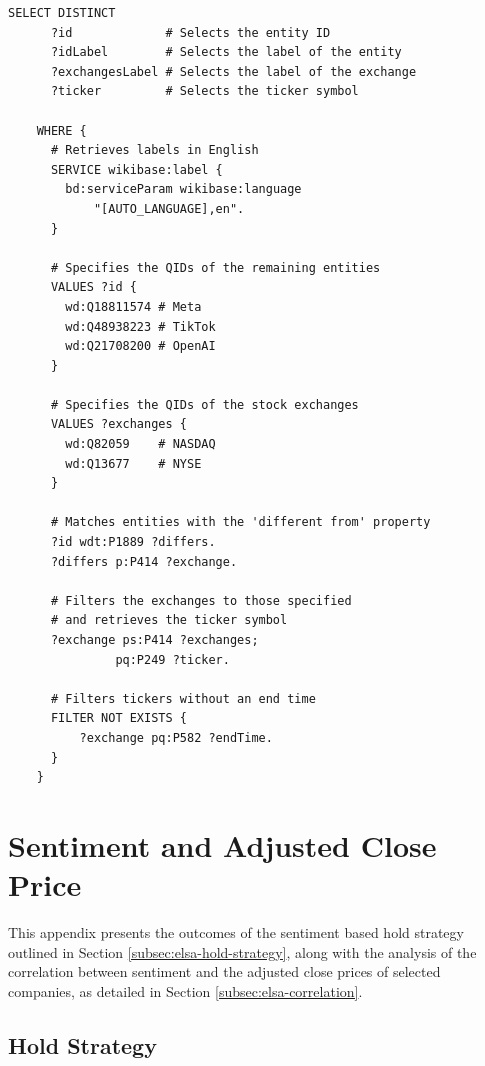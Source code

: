 \begin{lstlisting}[language=SPARQL, caption={SPARQL Query 3: Retrieve entity information for remaining entities with the \textit{different from} property.}, label={lst:sparql_query_3}]
	SELECT DISTINCT 
	  ?id             # Selects the entity ID
	  ?idLabel        # Selects the label of the entity
	  ?exchangesLabel # Selects the label of the exchange
	  ?ticker         # Selects the ticker symbol
	  
	WHERE {
	  # Retrieves labels in English
	  SERVICE wikibase:label {
		bd:serviceParam wikibase:language 
			"[AUTO_LANGUAGE],en".
	  }
	
	  # Specifies the QIDs of the remaining entities
	  VALUES ?id { 
		wd:Q18811574 # Meta
		wd:Q48938223 # TikTok
		wd:Q21708200 # OpenAI
	  }
	
	  # Specifies the QIDs of the stock exchanges
	  VALUES ?exchanges { 
		wd:Q82059    # NASDAQ
		wd:Q13677    # NYSE
	  }
	
	  # Matches entities with the 'different from' property
	  ?id wdt:P1889 ?differs.
	  ?differs p:P414 ?exchange.
	
	  # Filters the exchanges to those specified 
	  # and retrieves the ticker symbol
	  ?exchange ps:P414 ?exchanges; 
			   pq:P249 ?ticker.
			   
	  # Filters tickers without an end time
	  FILTER NOT EXISTS {
		  ?exchange pq:P582 ?endTime.
	  }
	}
  \end{lstlisting}

\chapter{Sentiment and Adjusted Close Price}
\label{app:sentiment-adjusted-close-price}
This appendix presents the outcomes of the sentiment based hold strategy outlined in Section \ref{subsec:elsa-hold-strategy}, along with the analysis of the correlation between sentiment and the adjusted close prices of selected companies, as detailed in Section \ref{subsec:elsa-correlation}.

\section{Hold Strategy}
\label{appsec:hold-strategy}

